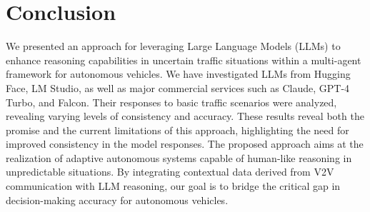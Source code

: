 \documentclass[conference]{IEEEtran}
\begin{document}
\section{Conclusion}
We presented an approach for leveraging Large Language Models (LLMs) to enhance reasoning capabilities in uncertain traffic situations within a multi-agent framework for autonomous vehicles. We have investigated LLMs from Hugging Face, LM Studio, as well as major commercial services such as Claude, GPT-4 Turbo, and Falcon. Their responses to basic traffic scenarios were analyzed, revealing varying levels of consistency and accuracy. These results reveal both the promise and the current limitations of this approach, highlighting the need for improved consistency in the model responses. The proposed approach aims at the realization of adaptive autonomous systems capable of human-like reasoning in unpredictable situations. By integrating contextual data derived from V2V communication with LLM reasoning, our goal is to bridge the critical gap in decision-making accuracy for autonomous vehicles.


\end{document}
